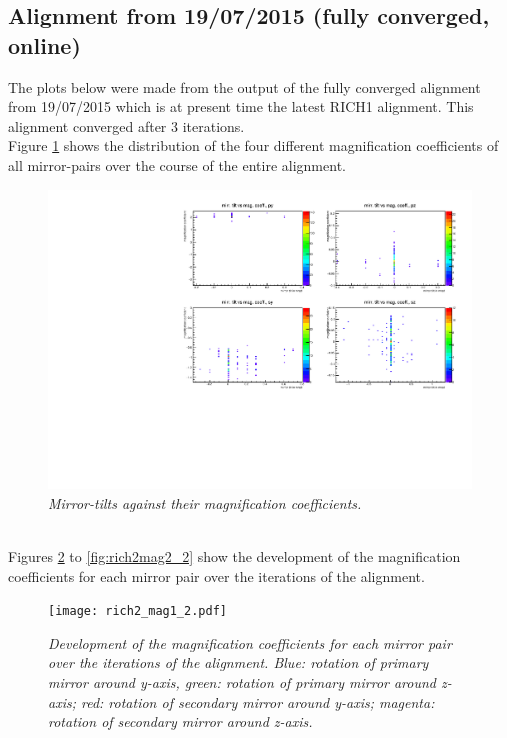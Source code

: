 \subsection{Alignment from 19/07/2015 (fully converged, online)}
The plots below were made from the output of the fully converged alignment from 19/07/2015 which is at present time the latest RICH1 alignment. This alignment converged after 3 iterations.\\
Figure \ref{fig:rich22d_2} shows the distribution of the four different magnification coefficients of all mirror-pairs over the course of the entire alignment. \\
\begin{figure}[!ht]
	\vspace*{-0.cm}
	\begin{center}
		\includegraphics[width=1.\textwidth]{2dplot_rich2_1.pdf}
		\vspace*{-1.5cm}
	\end{center}
	\caption{\textit{Mirror-tilts against their magnification coefficients.}}
	\label{fig:rich22d_2}
\end{figure}
\\
Figures \ref{fig:rich2mag1_2} to \ref{fig:rich2mag2_2} show the development of the magnification coefficients for each mirror pair over the iterations of the alignment.\\
\begin{figure}[!ht]
	\vspace*{-0.cm}
	\begin{center}
		\texttt{[image: rich2\_mag1\_2.pdf]}
		\vspace*{-1.5cm}
	\end{center}
	\caption{\textit{Development of the magnification coefficients for each mirror pair over the iterations of the alignment. Blue: rotation of primary mirror around y-axis, green: rotation of primary mirror around z-axis; red: rotation of secondary mirror around y-axis; magenta: rotation of secondary mirror around z-axis.}}
	\label{fig:rich2mag1_2}
\end{figure}

